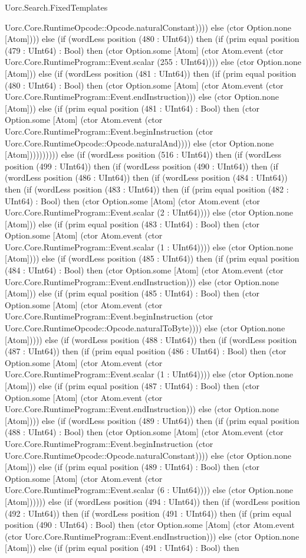 \begin{lexlean}{Uorc.Search.FixedTemplates}
\begin{semanticmodule}
{Uorc.Core.RuntimeOpcode::Opcode.naturalConstant)))) else (ctor Option.none [Atom]))) else (if (wordLess position (480 : UInt64)) then (if (prim equal position (479 : UInt64) : Bool) then (ctor Option.some [Atom] (ctor Atom.event (ctor Uorc.Core.RuntimeProgram::Event.scalar (255 : UInt64)))) else (ctor Option.none [Atom])) else (if (wordLess position (481 : UInt64)) then (if (prim equal position (480 : UInt64) : Bool) then (ctor Option.some [Atom] (ctor Atom.event (ctor Uorc.Core.RuntimeProgram::Event.endInstruction))) else (ctor Option.none [Atom])) else (if (prim equal position (481 : UInt64) : Bool) then (ctor Option.some [Atom] (ctor Atom.event (ctor Uorc.Core.RuntimeProgram::Event.beginInstruction (ctor Uorc.Core.RuntimeOpcode::Opcode.naturalAnd)))) else (ctor Option.none [Atom]))))))))) else (if (wordLess position (516 : UInt64)) then (if (wordLess position (499 : UInt64)) then (if (wordLess position (490 : UInt64)) then (if (wordLess position (486 : UInt64)) then (if (wordLess position (484 : UInt64)) then (if (wordLess position (483 : UInt64)) then (if (prim equal position (482 : UInt64) : Bool) then (ctor Option.some [Atom] (ctor Atom.event (ctor Uorc.Core.RuntimeProgram::Event.scalar (2 : UInt64)))) else (ctor Option.none [Atom])) else (if (prim equal position (483 : UInt64) : Bool) then (ctor Option.some [Atom] (ctor Atom.event (ctor Uorc.Core.RuntimeProgram::Event.scalar (1 : UInt64)))) else (ctor Option.none [Atom]))) else (if (wordLess position (485 : UInt64)) then (if (prim equal position (484 : UInt64) : Bool) then (ctor Option.some [Atom] (ctor Atom.event (ctor Uorc.Core.RuntimeProgram::Event.endInstruction))) else (ctor Option.none [Atom])) else (if (prim equal position (485 : UInt64) : Bool) then (ctor Option.some [Atom] (ctor Atom.event (ctor Uorc.Core.RuntimeProgram::Event.beginInstruction (ctor Uorc.Core.RuntimeOpcode::Opcode.naturalToByte)))) else (ctor Option.none [Atom])))) else (if (wordLess position (488 : UInt64)) then (if (wordLess position (487 : UInt64)) then (if (prim equal position (486 : UInt64) : Bool) then (ctor Option.some [Atom] (ctor Atom.event (ctor Uorc.Core.RuntimeProgram::Event.scalar (1 : UInt64)))) else (ctor Option.none [Atom])) else (if (prim equal position (487 : UInt64) : Bool) then (ctor Option.some [Atom] (ctor Atom.event (ctor Uorc.Core.RuntimeProgram::Event.endInstruction))) else (ctor Option.none [Atom]))) else (if (wordLess position (489 : UInt64)) then (if (prim equal position (488 : UInt64) : Bool) then (ctor Option.some [Atom] (ctor Atom.event (ctor Uorc.Core.RuntimeProgram::Event.beginInstruction (ctor Uorc.Core.RuntimeOpcode::Opcode.naturalConstant)))) else (ctor Option.none [Atom])) else (if (prim equal position (489 : UInt64) : Bool) then (ctor Option.some [Atom] (ctor Atom.event (ctor Uorc.Core.RuntimeProgram::Event.scalar (6 : UInt64)))) else (ctor Option.none [Atom]))))) else (if (wordLess position (494 : UInt64)) then (if (wordLess position (492 : UInt64)) then (if (wordLess position (491 : UInt64)) then (if (prim equal position (490 : UInt64) : Bool) then (ctor Option.some [Atom] (ctor Atom.event (ctor Uorc.Core.RuntimeProgram::Event.endInstruction))) else (ctor Option.none [Atom])) else (if (prim equal position (491 : UInt64) : Bool) then }
\end{semanticmodule}
\end{lexlean}
